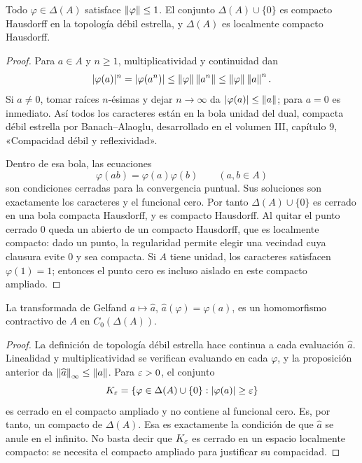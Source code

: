 \begin{proposicion}\label{v4:espectro-no-unitario}
Todo $\varphi\in\Delta(A)$ satisface $\left\lVert\varphi\right\rVert\le1$. El conjunto $\Delta(A)\cup\{0\}$ es compacto Hausdorff en la topología débil estrella, y $\Delta(A)$ es localmente compacto Hausdorff.
\end{proposicion}
\begin{proof}
Para $a\in A$ y $n\ge1$, multiplicatividad y continuidad dan
\[
 |\varphi(a)|^n=|\varphi(a^n)|\le\left\lVert\varphi\right\rVert\left\lVert a^n\right\rVert
 \le\left\lVert\varphi\right\rVert\left\lVert a\right\rVert^n.
\]
Si $a\ne0$, tomar raíces $n$-ésimas y dejar $n\to\infty$ da $|\varphi(a)|\le\left\lVert a\right\rVert$; para $a=0$ es inmediato. Así todos los caracteres están en la bola unidad del dual, compacta débil estrella por Banach--Alaoglu, desarrollado en el volumen III, capítulo 9, «Compacidad débil y reflexividad».

Dentro de esa bola, las ecuaciones
\[
 \varphi(ab)=\varphi(a)\varphi(b)\qquad(a,b\in A)
\]
son condiciones cerradas para la convergencia puntual. Sus soluciones son exactamente los caracteres y el funcional cero. Por tanto $\Delta(A)\cup\{0\}$ es cerrado en una bola compacta Hausdorff, y es compacto Hausdorff. Al quitar el punto cerrado $0$ queda un abierto de un compacto Hausdorff, que es localmente compacto: dado un punto, la regularidad permite elegir una vecindad cuya clausura evite $0$ y sea compacta. Si $A$ tiene unidad, los caracteres satisfacen $\varphi(1)=1$; entonces el punto cero es incluso aislado en este compacto ampliado.
\end{proof}

\begin{teorema}\label{v4:gelfand-cero-infinito}
La transformada de Gelfand $a\mapsto\widehat a$, $\widehat a(\varphi)=\varphi(a)$, es un homomorfismo contractivo de $A$ en $C_0(\Delta(A))$.
\end{teorema}
\begin{proof}
La definición de topología débil estrella hace continua a cada evaluación $\widehat a$. Linealidad y multiplicatividad se verifican evaluando en cada $\varphi$, y la proposición anterior da $\left\lVert\widehat a\right\rVert_\infty\le\left\lVert a\right\rVert$. Para $\varepsilon>0$, el conjunto
\[
 K_\varepsilon=\{\varphi\in\Delta(A)\cup\{0\}:|\varphi(a)|\ge\varepsilon\}
\]
es cerrado en el compacto ampliado y no contiene al funcional cero. Es, por tanto, un compacto de $\Delta(A)$. Esa es exactamente la condición de que $\widehat a$ se anule en el infinito. No basta decir que $K_\varepsilon$ es cerrado en un espacio localmente compacto: se necesita el compacto ampliado para justificar su compacidad.
\end{proof}

